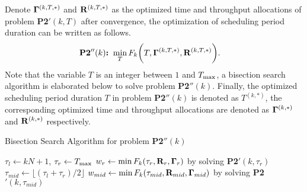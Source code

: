 Denote ${\mathbf{\Gamma}^{(k,T,*)}}$ and ${\mathbf{R}^{(k,T,*)}}$ as the optimized time and throughput allocations of problem \textbf{P2$'(k,T)$} after convergence, the optimization of scheduling period duration can be written as follows.
\begin{align}
    \textbf{P2$''(k)$:~} & \min_{T} F_{k}  \bigg(T, {\mathbf{\Gamma}^{(k,T,*)}}, {\mathbf{R}^{(k,T,*)}} \bigg).
    \label{eqn:p2pp_k}
\end{align}
Note that the variable $T$ is an integer between $1$ and ${T_{\max}}$, a  bisection search algorithm is elaborated below to solve problem \textbf{P2$''(k)$}. Finally, the optimized scheduling period duration $T$ in problem \textbf{P2$''(k)$} is denoted as $T^{(k,*)}$, the corresponding optimized time and throughput allocations are denoted as $\mathbf{\Gamma}^{(k,*)}$ and  ${\mathbf{R}^{(k,*)}}$ respectively. 
\begin{algorithm}[ht]
    \caption{Bisection Search Algorithm for problem \textbf{P2$''(k)$}}\label{alg_bnb}
    \DontPrintSemicolon
    $\tau_{l} \gets kN+1$, $\tau_{r} \gets {T_{\max}}$\;
     $w_{r} \gets \min F_{k}( \tau_{r}, \mathbf{R}_{r}, \mathbf{\Gamma}_{r} )$ by solving \textbf{P2$'( k,\tau_{r} )$}\;
    {
        $\tau_{mid} \gets \lfloor{ (\tau_{l} + \tau_{r})/2 }\rfloor$\;
        $w_{mid} \gets \min F_{k}( \tau_{mid}, \mathbf{R}_{mid}, \mathbf{\Gamma}_{mid} )$ by solving \textbf{P2$'( k,\tau_{mid} )$}\;
    }
    \;
\end{algorithm}

\section{ }
\label{sec:local-policy}

